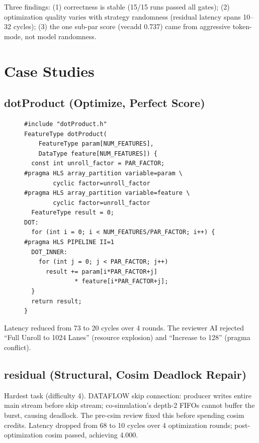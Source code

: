 \documentclass[10pt,conference,letterpaper]{IEEEtran}
\begin{document}
Three findings: (1) correctness is stable (15/15 runs passed all gates); (2) optimization quality varies with strategy randomness (residual latency spans 10--32 cycles); (3) the one sub-par score (vecadd 0.737) came from aggressive token-mode, not model randomness.

\section{Case Studies}
\label{app:cases}

\subsection{dotProduct (Optimize, Perfect Score)}

\begin{figure}[h]
\centering
\begin{lstlisting}[caption={Optimized dotProduct kernel (51.35$\times$ acceleration).},label={lst:dotproduct}]
#include "dotProduct.h"
FeatureType dotProduct(
    FeatureType param[NUM_FEATURES],
    DataType feature[NUM_FEATURES]) {
  const int unroll_factor = PAR_FACTOR;
#pragma HLS array_partition variable=param \
        cyclic factor=unroll_factor
#pragma HLS array_partition variable=feature \
        cyclic factor=unroll_factor
  FeatureType result = 0;
DOT:
  for (int i = 0; i < NUM_FEATURES/PAR_FACTOR; i++) {
#pragma HLS PIPELINE II=1
  DOT_INNER:
    for (int j = 0; j < PAR_FACTOR; j++)
      result += param[i*PAR_FACTOR+j]
              * feature[i*PAR_FACTOR+j];
  }
  return result;
}
\end{lstlisting}
\end{figure}

Latency reduced from 73 to 20 cycles over 4 rounds. The reviewer AI rejected ``Full Unroll to 1024 Lanes'' (resource explosion) and ``Increase to 128'' (pragma conflict).

\subsection{residual (Structural, Cosim Deadlock Repair)}

Hardest task (difficulty 4). DATAFLOW skip connection: producer writes entire main stream before skip stream; co-simulation's depth-2 FIFOs cannot buffer the burst, causing deadlock. The pre-csim review fixed this before spending cosim credits. Latency dropped from 68 to 10 cycles over 4 optimization rounds; post-optimization cosim passed, achieving 4.000.
\end{document}
